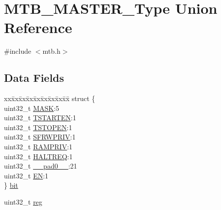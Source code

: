 \hypertarget{union_m_t_b___m_a_s_t_e_r___type}{}\section{M\+T\+B\+\_\+\+M\+A\+S\+T\+E\+R\+\_\+\+Type Union Reference}
\label{union_m_t_b___m_a_s_t_e_r___type}


{\ttfamily \#include $<$mtb.\+h$>$}

\subsection*{Data Fields}
\begin{DoxyCompactItemize}
\item 
\begin{tabbing}
xx\=xx\=xx\=xx\=xx\=xx\=xx\=xx\=xx\=\kill
struct \{\\
\>uint32\_t \mbox{\hyperlink{union_m_t_b___m_a_s_t_e_r___type_a33f6052ebf71e72af18f19c6edadafc4}{MASK}}:5\\
\>uint32\_t \mbox{\hyperlink{union_m_t_b___m_a_s_t_e_r___type_ad0cbf3c1b5665d5c3a7c6e1770b850c9}{TSTARTEN}}:1\\
\>uint32\_t \mbox{\hyperlink{union_m_t_b___m_a_s_t_e_r___type_a9fc39c3f468f353bccdba3099c9a1961}{TSTOPEN}}:1\\
\>uint32\_t \mbox{\hyperlink{union_m_t_b___m_a_s_t_e_r___type_a550009fded01cf39a9427257fa9f98ad}{SFRWPRIV}}:1\\
\>uint32\_t \mbox{\hyperlink{union_m_t_b___m_a_s_t_e_r___type_a95bc4fb755509c1aee06d859eebe0baf}{RAMPRIV}}:1\\
\>uint32\_t \mbox{\hyperlink{union_m_t_b___m_a_s_t_e_r___type_ae67eceb76cbcb737f0fac508adb28a6b}{HALTREQ}}:1\\
\>uint32\_t \mbox{\hyperlink{union_m_t_b___m_a_s_t_e_r___type_a3e57c2ef1c3ffb36722f000cc1156824}{\_\_pad0\_\_}}:21\\
\>uint32\_t \mbox{\hyperlink{union_m_t_b___m_a_s_t_e_r___type_a44ee0aa467686d762114e9d6851bf660}{EN}}:1\\
\} \mbox{\hyperlink{union_m_t_b___m_a_s_t_e_r___type_aafea16104b1366d3dce3516163afa734}{bit}}\\

\end{tabbing}\item 
uint32\+\_\+t \mbox{\hyperlink{union_m_t_b___m_a_s_t_e_r___type_a6b91636401516a477989a336376d7b40}{reg}}
\end{DoxyCompactItemize}


